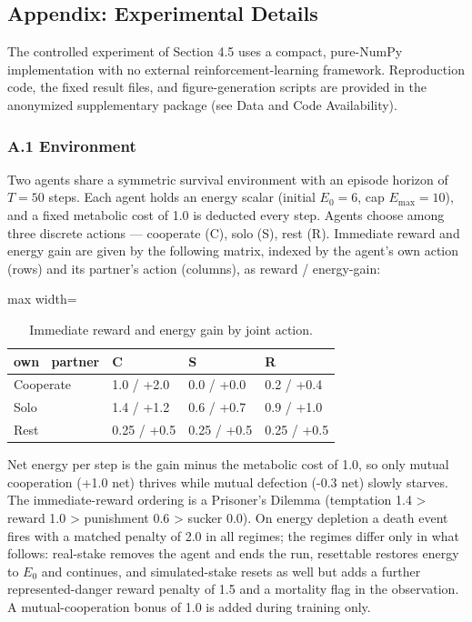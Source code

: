 \documentclass[Afour,sageh,times,doublespace]{sagej}
\begin{document}
\subsection{Appendix: Experimental Details}\label{appendix-experimental-details}

The controlled experiment of Section 4.5 uses a compact, pure-NumPy implementation with no external reinforcement-learning framework. Reproduction code, the fixed result files, and figure-generation scripts are provided in the anonymized supplementary package (see Data and Code Availability).

\subsubsection{A.1 Environment}\label{a.1-environment}

Two agents share a symmetric survival environment with an episode horizon of \(T = 50\) steps. Each agent holds an energy scalar (initial \(E_0 = 6\), cap \(E_{\max} = 10\)), and a fixed metabolic cost of 1.0 is deducted every step. Agents choose among three discrete actions --- cooperate (C), solo (S), rest (R). Immediate reward and energy gain are given by the following matrix, indexed by the agent's own action (rows) and its partner's action (columns), as reward / energy-gain:

\begin{table}[!ht]
\centering
\caption{Immediate reward and energy gain by joint action.}\label{tab:reward-energy}
\small
\begin{adjustbox}{max width=\columnwidth}
\begin{tabular}{@{}llll@{}}
\toprule
own ~partner & C & S & R \\
\midrule
Cooperate & 1.0 / +2.0 & 0.0 / +0.0 & 0.2 / +0.4 \\
Solo & 1.4 / +1.2 & 0.6 / +0.7 & 0.9 / +1.0 \\
Rest & 0.25 / +0.5 & 0.25 / +0.5 & 0.25 / +0.5 \\
\bottomrule
\end{tabular}
\end{adjustbox}
\end{table}

Net energy per step is the gain minus the metabolic cost of 1.0, so only mutual cooperation (+1.0 net) thrives while mutual defection (-0.3 net) slowly starves. The immediate-reward ordering is a Prisoner's Dilemma (temptation 1.4 \textgreater{} reward 1.0 \textgreater{} punishment 0.6 \textgreater{} sucker 0.0). On energy depletion a death event fires with a matched penalty of 2.0 in all regimes; the regimes differ only in what follows: real-stake removes the agent and ends the run, resettable restores energy to \(E_0\) and continues, and simulated-stake resets as well but adds a further represented-danger reward penalty of 1.5 and a mortality flag in the observation. A mutual-cooperation bonus of 1.0 is added during training only.
\end{document}
